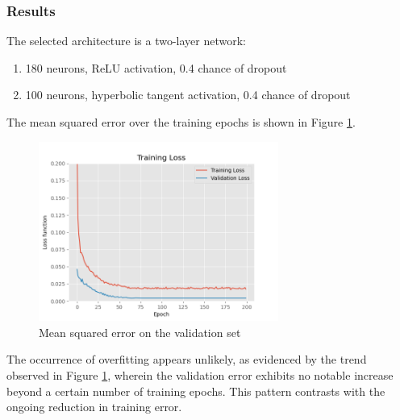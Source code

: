 \subsubsection{Results}

The selected architecture is a two-layer network:
\begin{enumerate}
    \item 180 neurons, ReLU activation, 0.4 chance of dropout
    \item 100 neurons, hyperbolic tangent activation, 0.4 chance of dropout
\end{enumerate}

The mean squared error over the training epochs is shown in Figure \ref{fig:nn-validation-error-curve}.

\begin{figure}[h]
    \centering
    \includegraphics[width=0.7\textwidth]{resources/images/mse-finalarch.png}
    \caption{Mean squared error on the validation set}
    \label{fig:nn-validation-error-curve}
\end{figure}

The occurrence of overfitting appears unlikely, as evidenced by the trend observed in Figure \ref{fig:nn-validation-error-curve}, wherein the validation error exhibits no notable increase beyond a certain number of training epochs. This pattern contrasts with the ongoing reduction in training error.

